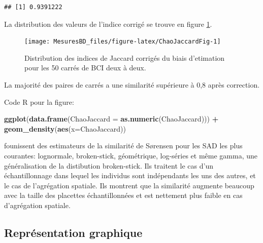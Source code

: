 \documentclass[
  11pt,
  french,
  a4paper,
  extrafontsizes,onecolumn,openright
  ]{memoir}
\newenvironment{Shaded}{\begin{snugshade}}{\end{snugshade}}
\newcommand{\AttributeTok}[1]{\textcolor[rgb]{0.13,0.29,0.53}{#1}}
\newcommand{\FunctionTok}[1]{\textcolor[rgb]{0.13,0.29,0.53}{\textbf{#1}}}
\newcommand{\NormalTok}[1]{#1}
\newcommand{\SpecialCharTok}[1]{\textcolor[rgb]{0.81,0.36,0.00}{\textbf{#1}}}
\begin{document}
\begin{verbatim}
## [1] 0.9391222
\end{verbatim}

\normalsize

La distribution des valeurs de l'indice corrigé se trouve en figure \ref{fig:ChaoJaccardFig}.



\scriptsize

\begin{figure}

{\centering \texttt{[image: MesuresBD\_files/figure-latex/ChaoJaccardFig-1]} 

}

\caption{Distribution des indices de Jaccard corrigés du biais d'etimation pour les 50 carrés de BCI deux à deux.}\label{fig:ChaoJaccardFig}
\end{figure}

\normalsize

La majorité des paires de carrés a une similarité supérieure à 0,8 après correction.

Code R pour la figure:

\scriptsize

\begin{Shaded}
\begin{Highlighting}[]
\FunctionTok{ggplot}\NormalTok{(}\FunctionTok{data.frame}\NormalTok{(}\AttributeTok{ChaoJaccard =} \FunctionTok{as.numeric}\NormalTok{(ChaoJaccard))) }\SpecialCharTok{+}
  \FunctionTok{geom\_density}\NormalTok{(}\FunctionTok{aes}\NormalTok{(}\AttributeTok{x=}\NormalTok{ChaoJaccard))}
\end{Highlighting}
\end{Shaded}

\normalsize

\textcite{Plotkin2002} founissent des estimateurs de la similarité de Sørensen pour les SAD les plus courantes: lognormale, broken-stick, géométrique, log-séries et même gamma, une généralisation de la distibution broken-stick.
Ils traitent le cas d'un échantillonnage dans lequel les individus sont indépendants les uns des autres, et le cas de l'agrégation spatiale.
Ils montrent que la similarité augmente beaucoup avec la taille des placettes échantillonnées et est nettement plus faible en cas d'agrégation spatiale.

\subsection{Représentation graphique}\label{repruxe9sentation-graphique}
\end{document}
